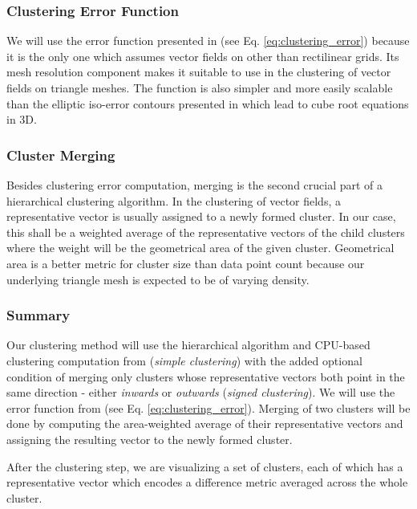 \subsubsection{Clustering Error Function}

We will use the error function presented in \citet{Peng12} (see Eq. \ref{eq:clustering_error}) because it is the only one which assumes vector fields on other than rectilinear grids. Its mesh resolution component makes it suitable to use in the clustering of vector fields on triangle meshes. The function is also simpler and more easily scalable than the elliptic iso-error contours presented in \citet{Telea99} which lead to cube root equations in 3D.

\subsubsection{Cluster Merging}

Besides clustering error computation, merging is the second crucial part of a hierarchical clustering algorithm. In the clustering of vector fields, a representative vector is usually assigned to a newly formed cluster. In our case, this shall be a weighted average of the representative vectors of the child clusters where the weight will be the geometrical area of the given cluster. Geometrical area is a better metric for cluster size than data point count because our underlying triangle mesh is expected to be of varying density.

\subsubsection{Summary}

Our clustering method will use the hierarchical algorithm and CPU-based clustering computation from \citet{Telea99} ({\it simple clustering}) with the added optional condition of merging only clusters whose representative vectors both point in the same direction - either {\it inwards} or {\it outwards} ({\it signed clustering}). We will use the error function from \citet{Peng12} (see Eq. \ref{eq:clustering_error}). Merging of two clusters will be done by computing the area-weighted average of their representative vectors and assigning the resulting vector to the newly formed cluster.

After the clustering step, we are visualizing a set of clusters, each of which has a representative vector which encodes a difference metric averaged across the whole cluster.
